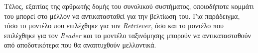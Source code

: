 Τέλος, εξαιτίας της αρθρωτής δομής του συνολικού συστήματος, οποιοδήποτε κομμάτι του μπορεί στο μέλλον να αντικατασταθεί για την βελτίωση του. Για παράδειγμα, τόσο το μοντέλο που επιλέχθηκε για τον \emph{Retriever}, όσο και το μοντέλο που επιλέχθηκε για τον \emph{Reader} και το μοντέλο ταξινόμησης μπορούν να αντικατασταθούν από αποδοτικότερα που θα αναπτυχθούν μελλοντικά.